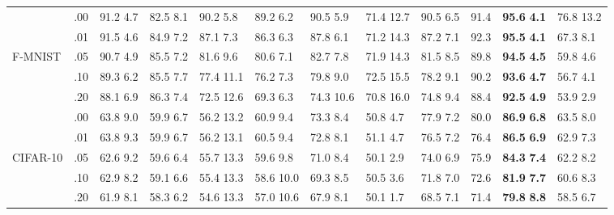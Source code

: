 \documentclass{bmvc2k}
\begin{document}
\begin{table*}[t]
{\begin{tabular}{C{1.2cm}C{0.5cm}C{1.0cm}C{1.0cm}C{1.0cm}C{1.0cm}C{1.0cm}C{1.0cm}C{1.0cm}C{0.6cm}C{1.0cm}C{1.0cm}}
\cmidrule(lr){1-1} \cmidrule(lr){2-2} \cmidrule(lr){3-3} \cmidrule(lr){4-4} \cmidrule(lr){5-5} \cmidrule(lr){6-6} \cmidrule(lr){7-7} \cmidrule(lr){8-8} \cmidrule(lr){9-9} 
\cmidrule(lr){10-10}
\cmidrule(lr){11-11} \cmidrule(lr){12-12}
& .00 & 91.2  4.7 & 82.5  8.1 & 90.2  5.8 & 89.2  6.2 & 90.5  5.9 & 71.4  12.7 & 90.5  6.5 & 91.4 & \textbf{95.6}  \textbf{4.1} & 76.8  13.2 \\
& .01 & 91.5  4.6 & 84.9  7.2 & 87.1  7.3 & 86.3  6.3 & 87.8  6.1 & 71.2  14.3 & 87.2  7.1 & 92.3 & \textbf{95.5}  \textbf{4.1} & 67.3  8.1 \\
F-MNIST & .05 & 90.7  4.9 & 85.5  7.2 & 81.6  9.6 & 80.6  7.1 & 82.7  7.8 & 71.9  14.3 & 81.5  8.5& 89.8  & \textbf{94.5}  \textbf{4.5} & 59.8  4.6 \\
& .10 & 89.3  6.2 & 85.5  7.7 & 77.4  11.1 & 76.2  7.3 & 79.8  9.0 & 72.5  15.5 & 78.2  9.1 & 90.2  & \textbf{93.6}  \textbf{4.7} & 56.7  4.1 \\
& .20 & 88.1  6.9 & 86.3  7.4 & 72.5  12.6 & 69.3  6.3 & 74.3  10.6 & 70.8  16.0 & 74.8  9.4 & 88.4 & \textbf{92.5}  \textbf{4.9} & 53.9  2.9 \\
\cmidrule(lr){1-1} \cmidrule(lr){2-2} \cmidrule(lr){3-3} \cmidrule(lr){4-4} \cmidrule(lr){5-5} \cmidrule(lr){6-6} \cmidrule(lr){7-7} \cmidrule(lr){8-8} \cmidrule(lr){9-9} 
\cmidrule(lr){10-10}
\cmidrule(lr){11-11} \cmidrule(lr){12-12}
& .00 & 63.8  9.0 & 59.9  6.7 & 56.2  13.2 & 60.9  9.4 & 73.3  8.4 & 50.8  4.7 & 77.9  7.2 & 80.0  & \textbf{86.9}  \textbf{6.8} & 63.5  8.0 \\
& .01 & 63.8  9.3 & 59.9  6.7 & 56.2  13.1 & 60.5  9.4 & 72.8  8.1 & 51.1  4.7 & 76.5  7.2 & 76.4  & \textbf{86.5}  \textbf{6.9} & 62.9  7.3 \\
CIFAR-10 & .05 & 62.6  9.2 & 59.6  6.4 & 55.7  13.3 & 59.6  9.8 & 71.0  8.4 & 50.1  2.9 & 74.0  6.9 & 75.9 & \textbf{84.3}  \textbf{7.4} & 62.2  8.2 \\
& .10 & 62.9  8.2 & 59.1  6.6 & 55.4  13.3 & 58.6  10.0 & 69.3  8.5 & 50.5  3.6 & 71.8  7.0 & 72.6 & \textbf{81.9}  \textbf{7.7} & 60.6  8.3 \\
& .20 & 61.9  8.1 & 58.3  6.2 & 54.6  13.3 & 57.0  10.6 & 67.9  8.1 & 50.1  1.7 & 68.5  7.1 & 71.4  & \textbf{79.8}  \textbf{8.8} & 58.5  6.7 \\
\bottomrule
\end{tabular}}
\end{table*}
\end{document}
